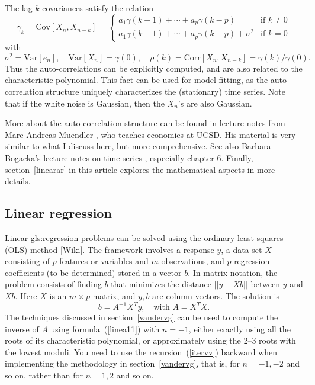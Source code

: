 \documentclass[oneside,10pt]{book}
\begin{document}
\noindent The lag-$k$ covariances satisfy the relation
$$
\gamma_k=\text{Cov}[X_n,X_{n-k}]=\left\{
\begin{array}{ll}
a_1 \gamma(k-1)+\cdots + a_p\gamma(k-p) &   \text{if } k\neq 0 \\ [6pt]
a_1   \gamma(k-1)+\cdots + a_p\gamma(k-p) + \sigma^2 & \text{if } k= 0
\end{array}
\right.
$$
with
$$
\sigma^2=\text{Var}[e_n],\quad \text{Var}[X_n]=\gamma(0),\quad \rho(k)=\text{Corr}[X_n,X_{n-k}]=\gamma(k)/\gamma(0).
$$
\noindent Thus the auto-correlations can be explicitly computed, and are also related to the characteristic polynomial. This fact can be used for model fitting, as the auto-correlation structure uniquely characterizes the (stationary) time series. Note that if the white noise is Gaussian, then the $X_n$'s are also Gaussian.

More about the auto-correlation structure can be found in lecture notes from Marc-Andreas Muendler \cite{mamu}, who teaches economics at UCSD. His material is very similar to what I discuss here, but more comprehensive. See also Barbara Bogacka's lecture notes on time series \cite{bbog}, especially chapter 6. Finally, section~\ref{linearar} in this article explores the mathematical aspects in more details.

\subsection{Linear regression}

Linear \gls{gls:regression} problems can be solved using the \textcolor{index}{ordinary least squares} (OLS) method [\href{https://en.wikipedia.org/wiki/Ordinary_least_squares}{Wiki}].
The framework involves a response $y$, a data set $X$ consisting of $p$ features or variables and $m$ observations, and $p$ regression coefficients (to be determined) stored in a vector $b$. In matrix notation, the problem consists of finding $b$ that minimizes
the distance $||y - Xb||$ between $y$ and $Xb$. Here $X$ is an $m\times p$ matrix, and $y,b$ are column vectors. The solution is
$$
b= A^{-1}X^T y, \quad \text{with } A = X^TX.
$$
The techniques discussed in section~\ref{vandervg} can be used to compute the inverse of $A$ using formula~(\ref{linea11}) with $n=-1$, either exactly using all the roots of its
\textcolor{index}{characteristic polynomial}, or approximately using the $2$--$3$ roots with the lowest moduli. You need to use the recursion~(\ref{itervv}) backward when implementing the methodology in section~\ref{vandervg}, that is, for $n=-1,-2$ and so on, rather than for $n=1,2$ and so on.
\end{document}
